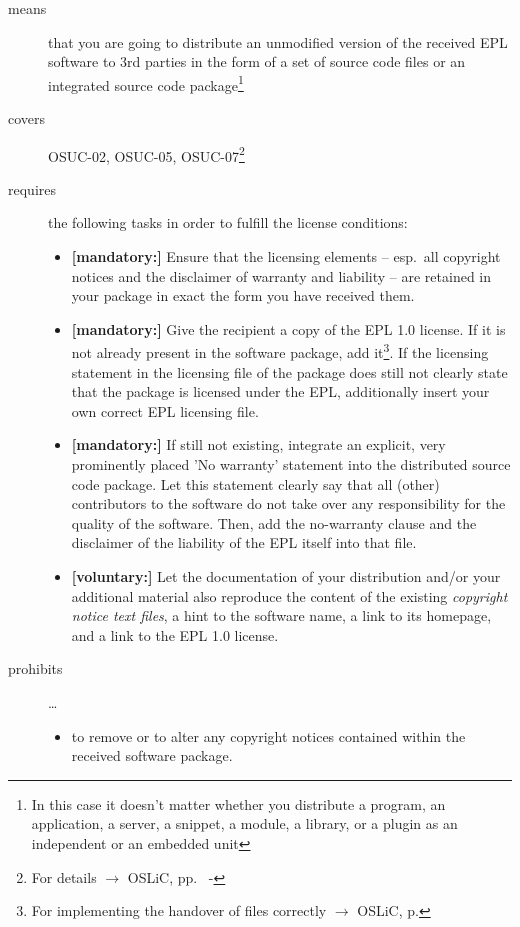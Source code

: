 \begin{description}

\item[means] that you are going to distribute an unmodified version of the
received EPL software to 3rd parties in the form of a set of source code files or
an integrated source code package\footnote{In this case it doesn't matter
whether you  distribute a program, an application, a server, a snippet, a
module, a library, or a plugin as an independent or an embedded unit}

\item[covers] OSUC-02, OSUC-05, OSUC-07\footnote{For details $\rightarrow$ OSLiC, pp.\ 
\pageref{OSUC-02-DEF} - \pageref{OSUC-07-DEF}}

\item[requires] the following tasks in order to fulfill the license conditions:
\begin{itemize}
  
  \item \textbf{[mandatory:]} Ensure that the licensing elements -- esp.\ all
  copyright notices and the disclaimer of warranty and liability -- are retained
  in your package in exact the form you have received them.
  
  \item \textbf{[mandatory:]} Give the recipient a copy of the EPL 1.0 license.
  If it is not already present in the software package, add it\footnote{For
  implementing the handover of files correctly $\rightarrow$ OSLiC, p.
  \pageref{DistributingFilesHint}}. If the licensing statement in the licensing
  file of the package does still not clearly state that the package is licensed
  under the EPL, additionally insert your own correct EPL licensing file.
  
  \item \textbf{[mandatory:]} If still not existing, integrate an explicit, very
  prominently placed 'No warranty' statement into the distributed source code
  package. Let this statement clearly say that all (other) contributors to the
  software do not take over any responsibility for the quality of the software.
  Then, add the no-warranty clause and the disclaimer of the liability of the
  EPL itself into that file.
  
  \item \textbf{[voluntary:]} Let the documentation of your distribution and/or
  your additional material also reproduce the content of the existing
  \emph{copyright notice text files}, a hint to the software name, a link to its
  homepage, and a link to the EPL 1.0 license.
\end{itemize}

\item[prohibits] \ldots
\begin{itemize}
  \item to remove or to alter any copyright notices contained within the
  received software package.
\end{itemize}

\end{description}



